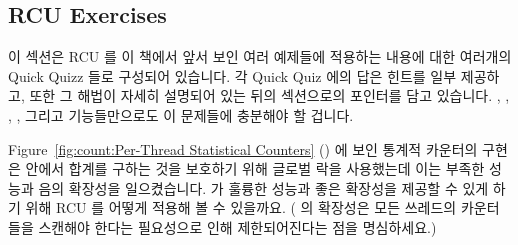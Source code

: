 
\subsection{RCU Exercises}
\label{sec:defer:RCU Exercises}

이 섹션은 RCU 를 이 책에서 앞서 보인 여러 예제들에 적용하는 내용에 대한
여러개의 Quick Quizz 들로 구성되어 있습니다.
각 Quick Quiz 에의 답은 힌트를 일부 제공하고, 또한 그 해법이 자세히 설명되어
있는 뒤의 섹션으로의 포인터를 담고 있습니다.
, , ,
, 그리고  기능들만으로도 이
문제들에 충분해야 할 겁니다.
\iffalse

This section is organized as a series of Quick Quizzes that invite you
to apply RCU to a number of examples earlier in this book.
The answer to each Quick Quiz gives some hints, and also contains a
pointer to a later section where the solution is explained at length.
The \co{rcu_read_lock()}, \co{rcu_read_unlock()}, \co{rcu_dereference()},
\co{rcu_assign_pointer()}, and \co{synchronize_rcu()} primitives should
suffice for most of these exercises.
\fi

\QuickQuiz{}
	Figure~\ref{fig:count:Per-Thread Statistical Counters}
	()
	에 보인 통계적 카운터의 구현은  안에서 합계를 구하는
	것을 보호하기 위해 글로벌 락을 사용했는데 이는 부족한 성능과 음의
	확장성을 일으켰습니다.
	 가 훌륭한 성능과 좋은 확장성을 제공할 수 있게 하기
	위해 RCU 를 어떻게 적용해 볼 수 있을까요.
	( 의 확장성은 모든 쓰레드의 카운터들을 스캔해야 한다는
	필요성으로 인해 제한되어진다는 점을 명심하세요.)
	\iffalse

